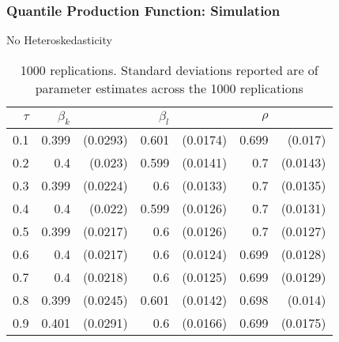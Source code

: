 \documentclass{beamer}
\begin{document}



\begin{frame}
\frametitle{Quantile Production Function: Simulation}
\begin{table}[ht]
\centering
\caption{No Heteroskedasticity}
\begin{tabular}{rrrrrrr}
  \hline
$\tau$ & $\beta_{k}$ &  & $\beta_{l}$ &  & $\rho$ &  \\ 
  \hline
0.1 & 0.399 & (0.0293) & 0.601 & (0.0174) & 0.699 & (0.017) \\ 
0.2 & 0.4 & (0.023) & 0.599 & (0.0141) & 0.7 & (0.0143) \\ 
0.3 & 0.399 & (0.0224) & 0.6 & (0.0133) & 0.7 & (0.0135) \\ 
0.4 & 0.4 & (0.022) & 0.599 & (0.0126) & 0.7 & (0.0131) \\ 
0.5 & 0.399 & (0.0217) & 0.6 & (0.0126) & 0.7 & (0.0127) \\ 
0.6 & 0.4 & (0.0217) & 0.6 & (0.0124) & 0.699 & (0.0128) \\ 
0.7 & 0.4 & (0.0218) & 0.6 & (0.0125) & 0.699 & (0.0129) \\ 
0.8 & 0.399 & (0.0245) & 0.601 & (0.0142) & 0.698 & (0.014) \\ 
0.9 & 0.401 & (0.0291) & 0.6 & (0.0166) & 0.699 & (0.0175) \\ 
   \hline
\end{tabular}
\caption{1000 replications. Standard deviations reported are of parameter estimates across the 1000 replications}
\end{table}

\end{frame}

\end{document}
